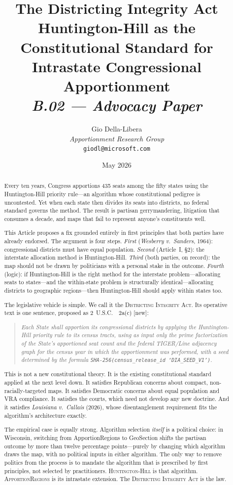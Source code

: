 \documentclass[12pt]{article}
\title{%
  \textbf{The Districting Integrity Act}\\[0.4em]
  \large Huntington-Hill as the Constitutional Standard for\\
  Intrastate Congressional Apportionment\\[0.8em]
  \normalsize\textit{B.02 --- Advocacy Paper}%
}
\author{%
  Gio Della-Libera\\
  \textit{Apportionment Research Group}\\
  \small\texttt{giodl@microsoft.com}
}
\date{May 2026}
\newcommand{\case}[1]{\textit{#1}}
\newcommand{\callais}{\case{Louisiana v.\ Callais}}
\newcommand{\wesberry}{\case{Wesberry v.\ Sanders}}
\newcommand{\dia}{\textsc{Districting Integrity Act}}
\newcommand{\hh}{\textsc{Huntington-Hill}}
\newcommand{\ar}{\textsc{ApportionRegions}}
\newcommand{\usca}{\textsection}
\begin{document}
\maketitle

\begin{abstract}
\noindent
Every ten years, Congress apportions 435 seats among the fifty states using
the Huntington-Hill priority rule---an algorithm whose constitutional
pedigree is uncontested.
Yet when each state then divides its seats into districts, no federal standard
governs the method.
The result is partisan gerrymandering, litigation that consumes a decade, and
maps that fail to represent anyone's constituents well.

This Article proposes a fix grounded entirely in first principles that both
parties have already endorsed.
The argument is four steps.
\emph{First} (\wesberry{}, 1964): congressional districts must have equal
population.
\emph{Second} (Article~I, \S2): the interstate allocation method is
Huntington-Hill.
\emph{Third} (both parties, on record): the map should not be drawn by
politicians with a personal stake in the outcome.
\emph{Fourth} (logic): if Huntington-Hill is the right method for the
interstate problem---allocating seats to states---and the within-state problem
is structurally identical---allocating districts to geographic regions---then
Huntington-Hill should apply within states too.

The legislative vehicle is simple.
We call it the \dia{}.
Its operative text is one sentence, proposed as 2~U.S.C.~\usca{}~2a(c) [new]:

\begin{quote}
  \itshape
  Each State shall apportion its congressional districts by applying the
  Huntington-Hill priority rule to its census tracts, using as input only the
  prime factorization of the State's apportioned seat count and the federal
  TIGER/Line adjacency graph for the census year in which the apportionment
  was performed, with a seed determined by the formula
  \texttt{SHA-256(census\_release\_id \textbar\textbar{} `DIA\_SEED\_V1')}.
\end{quote}

This is not a new constitutional theory.
It is the existing constitutional standard applied at the next level down.
It satisfies Republican concerns about compact, non-racially-targeted maps.
It satisfies Democratic concerns about equal population and VRA compliance.
It satisfies the courts, which need not develop any new doctrine.
And it satisfies \callais{} (2026), whose disentanglement requirement fits
the algorithm's architecture exactly.

The empirical case is equally strong.
Algorithm selection \emph{itself} is a political choice: in Wisconsin,
switching from ApportionRegions to GeoSection shifts the partisan outcome by
more than twelve percentage points---purely by changing which algorithm draws
the map, with no political inputs in either algorithm.
The only way to remove politics from the process is to mandate the algorithm
that is prescribed by first principles, not selected by practitioners.
\hh{} is that algorithm.
\ar{} is its intrastate extension.
The \dia{} is the law.
\end{abstract}
\end{document}
